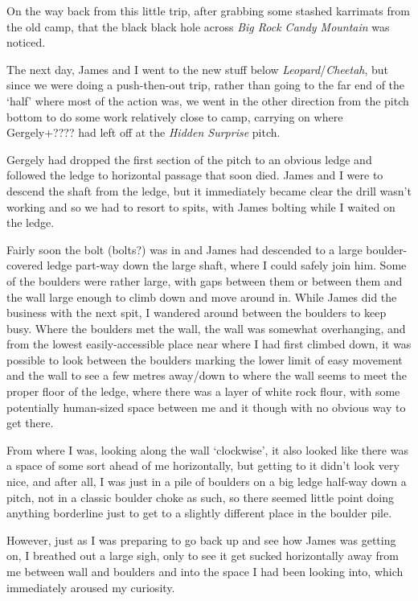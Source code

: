 On the way back from this little trip, after grabbing some stashed
karrimats from the old camp, that the black black hole across \emph{Big
Rock Candy Mountain} was noticed.

The next day, James and I went to the new stuff below
\emph{Leopard}/\emph{Cheetah}, but since we were doing a push-then-out
trip, rather than going to the far end of the `half' where most of the
action was, we went in the other direction from the pitch bottom to do
some work relatively close to camp, carrying on where Gergely+???? had
left off at the \emph{Hidden Surprise} pitch.

Gergely had dropped the first section of the pitch to an obvious ledge
and followed the ledge to horizontal passage that soon died. James and I
were to descend the shaft from the ledge, but it immediately became
clear the drill wasn't working and so we had to resort to spits, with
James bolting while I waited on the ledge.

Fairly soon the bolt (bolts?) was in and James had descended to a large
boulder-covered ledge part-way down the large shaft, where I could
safely join him. Some of the boulders were rather large, with gaps
between them or between them and the wall large enough to climb down and
move around in. While James did the business with the next spit, I
wandered around between the boulders to keep busy. Where the boulders
met the wall, the wall was somewhat overhanging, and from the lowest
easily-accessible place near where I had first climbed down, it was
possible to look between the boulders marking the lower limit of easy
movement and the wall to see a few metres away/down to where the wall
seems to meet the proper floor of the ledge, where there was a layer of
white rock flour, with some potentially human-sized space between me and
it though with no obvious way to get there.

From where I was, looking along the wall `clockwise', it also looked
like there was a space of some sort ahead of me horizontally, but
getting to it didn't look very nice, and after all, I was just in a pile
of boulders on a big ledge half-way down a pitch, not in a classic
boulder choke as such, so there seemed little point doing anything
borderline just to get to a slightly different place in the boulder
pile.

However, just as I was preparing to go back up and see how James was
getting on, I breathed out a large sigh, only to see it get sucked
horizontally away from me between wall and boulders and into the space I
had been looking into, which immediately aroused my curiosity.

